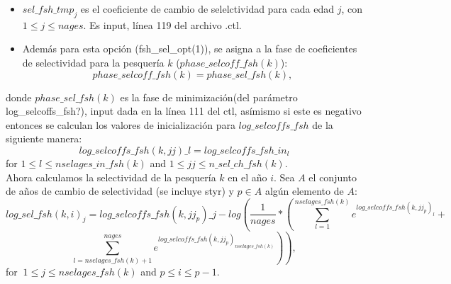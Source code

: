 \documentclass{article}
\begin{document}
\begin{itemize}

\begin{itemize}
    \item $sel\_fsh\_tmp_j$ es el coeficiente de cambio de selelctividad para cada edad $j$, con $1\leq j \leq nages$. Es input, línea 119 del archivo .ctl.
    \item Además para esta opción (fsh\_sel\_opt(1)), se asigna a la fase de coeficientes de selectividad para la pesquería $k$ ($phase\_selcoff\_fsh(k)$):
    \begin{equation}
        phase\_selcoff\_fsh(k)=phase\_sel\_fsh(k),
    \end{equation}
    \end{itemize}

    donde $phase\_sel\_fsh(k)$ es la fase de minimización(del parámetro log\_selcoffs\_fsh?), input dada en la línea 111 del ctl, asímismo si este es negativo entonces se calculan los valores de inicialización para $log\_selcoffs\_fsh$ de la siguiente manera:
    \begin{equation}
        log\_selcoffs\_fsh(k,jj)\_l = log\_selcoffs\_fsh\_in_l
    \end{equation}
for $1\leq l \leq nselages\_in\_fsh(k)$ and $1\leq jj \leq n\_sel\_ch\_fsh(k)$.\\

Ahora calculamos la selectividad de la pesquería $k$ en el año $i$. Sea $A$ el conjunto de años de cambio de selectividad (se incluye styr) y $p\in A$ algún elemento de $A$:
 \begin{equation}
        log\_sel\_fsh(k,i)_j=log\_selcoffs\_fsh(k,jj_p)\_j-log\left(\dfrac{1}{nages}*\left(\sum_{l=1}^{nselages\_fsh(k)}e^{log\_selcoffs\_fsh(k,jj_p)_l}+\right.\right.
    \end{equation}
    \begin{equation*}
       \left. \left.\sum_{l=nselages\_fsh(k)+1}^{nages}e^{log\_selcoffs\_fsh(k,jj_p)_{nselages\_fsh(k)}}\right)\right), 
    \end{equation*}
   for $\ 1\leq j \leq nselages\_fsh(k)$ and $p\leq i \leq p-1$.\\
   

\end{itemize}
\end{document}

